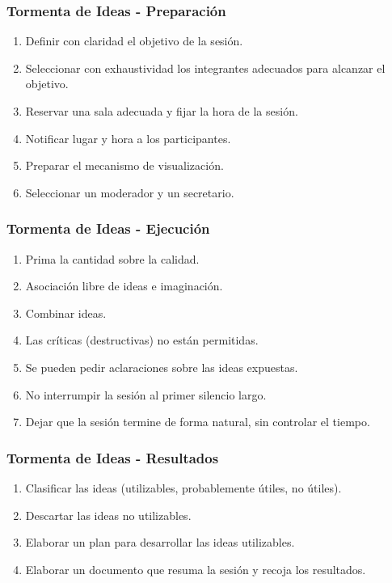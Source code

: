 ﻿\documentclass[handout,a4paper,slidestop,xcolor=pst,dvips,blue]{beamer}
\begin{document}
\begin{frame}[c]
    \frametitle{Tormenta de Ideas - Preparación}
    \begin{enumerate}[<+->]
        \item Definir con claridad el \alert{objetivo} de la sesión.
        \item Seleccionar con exhaustividad los integrantes adecuados para alcanzar el objetivo.
        \item Reservar una sala adecuada y fijar la hora de la sesión.
        \item Notificar lugar y hora a los participantes.
        \item Preparar el mecanismo de visualización.
        \item Seleccionar un moderador y un secretario.
    \end{enumerate}
\end{frame}

\begin{frame}[c]
    \frametitle{Tormenta de Ideas - Ejecución}
    \begin{enumerate}[<+->]
        \item Prima la cantidad sobre la calidad.
        \item Asociación libre de ideas e imaginación.
        \item Combinar ideas.
        \item Las críticas (destructivas) no están permitidas.
        \item Se pueden pedir aclaraciones sobre las ideas expuestas.
        \item No interrumpir la sesión al primer silencio largo.
        \item Dejar que la sesión termine de forma natural, sin controlar el tiempo.
    \end{enumerate}
\end{frame}

\begin{frame}[c]
    \frametitle{Tormenta de Ideas - Resultados}
    \begin{enumerate}[<+->]
        \item Clasificar las ideas (utilizables, probablemente útiles, no útiles).
        \item Descartar las ideas no utilizables.
        \item Elaborar un plan para desarrollar las ideas utilizables.
        \item Elaborar un documento que resuma la sesión y recoja los resultados.
    \end{enumerate}
\end{frame}
\end{document}
